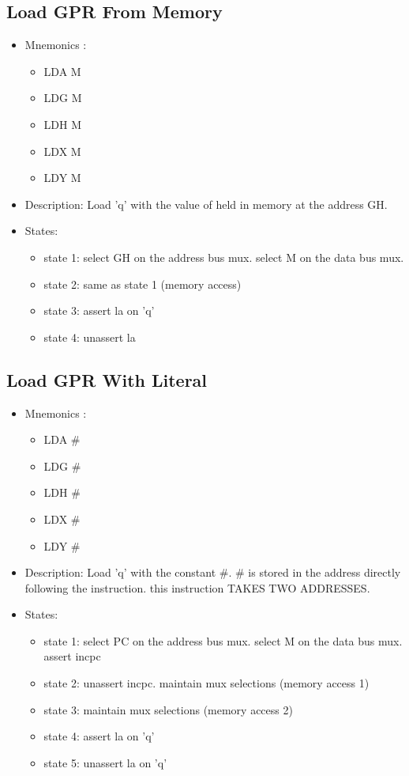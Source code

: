 \documentclass[a4paper,12pt]{article}
\begin{document}
\subsection{Load GPR From Memory}
\begin{itemize}
\item Mnemonics :
\begin{itemize}
	\item LDA M
	\item LDG M
	\item LDH M
	\item LDX M
	\item LDY M
\end{itemize}
\item Description: Load 'q' with the value of held in memory at the address GH.
\item States:
\begin{itemize}
	\item state 1: select GH on the address bus mux. select M on the data bus mux.
	\item state 2: same as state 1 (memory access)
	\item state 3: assert la on 'q'
	\item state 4: unassert la
\end{itemize}
\end{itemize}

\subsection{Load GPR With Literal}
\begin{itemize}
\item Mnemonics :
\begin{itemize}
	\item LDA \#
	\item LDG \#
	\item LDH \#
	\item LDX \#
	\item LDY \#
\end{itemize}
\item Description: Load 'q' with the constant \#. \# is stored in the address directly following the instruction. this instruction TAKES TWO ADDRESSES.
\item States:
\begin{itemize}
	\item state 1: select PC on the address bus mux. select M on the data bus mux. assert incpc
	\item state 2: unassert incpc. maintain mux selections (memory access 1)
	\item state 3: maintain mux selections (memory access 2)
	\item state 4: assert la on 'q'
	\item state 5: unassert la on 'q'
\end{itemize}
\end{itemize}
\end{document}

